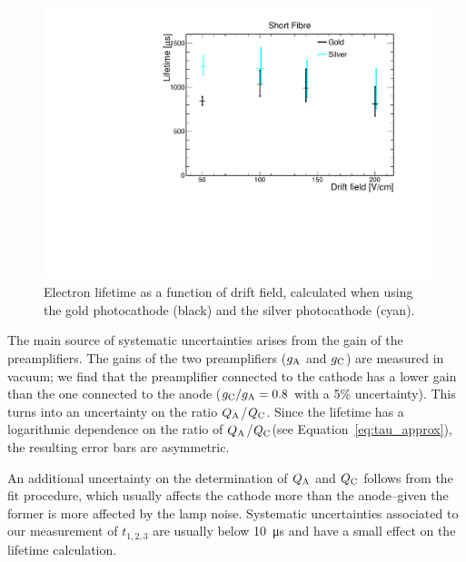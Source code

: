 \documentclass[a4paper,11pt]{article}
\newcommand{\QC}{\ensuremath{Q_{\rm C}}\xspace}
\newcommand{\QA}{\ensuremath{Q_{\rm A}}\xspace}
\begin{document}
\begin{figure}
    \centering
    \includegraphics[width=.7\linewidth, trim={0cm 0cm 0cm 1cm}, clip=true]{figures/LifetimeVSfield_ShortFibre.pdf}
    \caption{Electron lifetime as a function of drift field, calculated when using the gold photocathode (black) and the silver photocathode (cyan). }
    \label{fig:lifetimeVSfields}
\end{figure}

The main source of systematic uncertainties arises from the gain of the preamplifiers. The gains of the two preamplifiers ($g_{\rm A}$ and $g_{\rm C}$) are measured in vacuum; we find that the preamplifier connected to the cathode has a lower gain than the one connected to the anode ($g_{\rm C}/g_{\rm A}=0.8$ with a 5\% uncertainty). 
This turns into an uncertainty on the ratio \QA/\QC. Since the lifetime has a logarithmic dependence on the ratio of \QA/\QC (see Equation~\ref{eq:tau_approx}), the resulting error bars are asymmetric.%

An additional uncertainty on the determination of \QA and \QC follows from the fit procedure, which usually affects the cathode more than the anode--given the former is more affected by the lamp noise. %
Systematic uncertainties associated to our measurement of $t_{1,2,3}$ are usually below \SI{10}{\micro\second} and have a small effect on the lifetime calculation.
\end{document}
